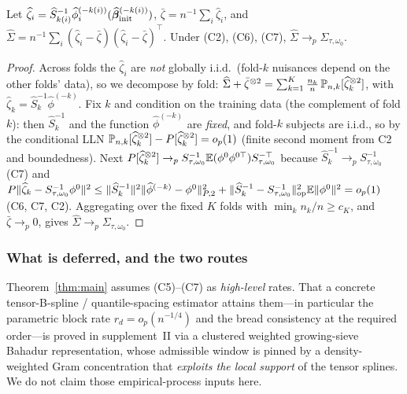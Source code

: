 \begin{corollary}\label{cor:sandwich}
Let $\widehat\zeta_i=\widehat S_{k(i)}^{-1}\widehat\phi_i^{(-k(i))}
(\widehat{\bm{\beta}}_{\rm init}^{(-k(i))})$, $\bar\zeta=n^{-1}\sum_i\widehat\zeta_i$, and
$\widehat\Sigma=n^{-1}\sum_i(\widehat\zeta_i-\bar\zeta)
(\widehat\zeta_i-\bar\zeta)^\top$. Under (C2), (C6), (C7),
$\widehat\Sigma\to_p\Sigma_{\tau,\omega_0}$.
\end{corollary}
\begin{proof}
Across folds the $\widehat\zeta_i$ are \emph{not} globally i.i.d.\ (fold-$k$
nuisances depend on the other folds' data), so we decompose by fold:
$\widehat\Sigma+\bar\zeta^{\otimes2}=\sum_{k=1}^K\frac{n_k}{n}\,\mathbb{P}_{n,k}
[\widehat\zeta_k^{\otimes2}]$, with $\widehat\zeta_k=\widehat S_k^{-1}
\widehat\phi^{(-k)}$. Fix $k$ and condition on the training data (the complement
of fold $k$): then $\widehat S_k^{-1}$ and the function $\widehat\phi^{(-k)}$ are
\emph{fixed}, and fold-$k$ subjects are i.i.d., so by the conditional LLN
$\mathbb{P}_{n,k}[\widehat\zeta_k^{\otimes2}]-P[\widehat\zeta_k^{\otimes2}]=o_p(1)$
(finite second moment from C2 and boundedness). Next
$P[\widehat\zeta_k^{\otimes2}]\to_p S_{\tau,\omega_0}^{-1}\mathbb{E}(\phi^0\phi^{0\top})
S_{\tau,\omega_0}^{-\top}$ because $\widehat S_k^{-1}\to_p S_{\tau,\omega_0}^{-1}$
(C7) and $P\|\widehat\zeta_k-S_{\tau,\omega_0}^{-1}\phi^0\|^2\le
\|\widehat S_k^{-1}\|^2\|\widehat\phi^{(-k)}-\phi^0\|_{P,2}^2
+\|\widehat S_k^{-1}-S_{\tau,\omega_0}^{-1}\|_{\rm op}^2\mathbb{E}\|\phi^0\|^2=o_p(1)$
(C6, C7, C2). Aggregating over the fixed $K$ folds with $\min_k n_k/n\ge c_K$,
and $\bar\zeta\to_p0$, gives $\widehat\Sigma\to_p\Sigma_{\tau,\omega_0}$.
\end{proof}

\subsubsection{What is deferred, and the two routes}\label{sec:routes}
Theorem~\ref{thm:main} assumes (C5)--(C7) as \emph{high-level} rates. That a
concrete tensor-B-spline / quantile-spacing estimator attains them---in
particular the parametric block rate $r_d=o_p(n^{-1/4})$ and the bread
consistency at the required order---is proved in supplement~II via a clustered
weighted growing-sieve Bahadur representation, whose admissible window is pinned
by a density-weighted Gram concentration that \emph{exploits the local support}
of the tensor splines. We do not claim those empirical-process inputs here.

